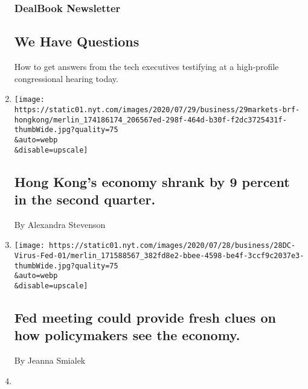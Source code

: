 \begin{enumerate}
  \hypertarget{dealbook-newsletter}{%
  \subsubsection{DealBook Newsletter}\label{dealbook-newsletter}}

  \hypertarget{we-have-questions}{%
  \subsection{We Have Questions}\label{we-have-questions}}

  How to get answers from the tech executives testifying at a
  high-profile congressional hearing today.
\item
  \href{/2020/07/29/business/hong-kongs-economy-shrank-by-9-percent-in-the-second-quarter.html}{}

  \texttt{[image: https://static01.nyt.com/images/2020/07/29/business/29markets-brf-hongkong/merlin\_174186174\_206567ed-298f-464d-b30f-f2dc3725431f-thumbWide.jpg?quality=75\\\&auto=webp\\\&disable=upscale]}

  \hypertarget{hong-kongs-economy-shrank-by-9-percent-in-the-second-quarter}{%
  \subsection{Hong Kong's economy shrank by 9 percent in the second
  quarter.}\label{hong-kongs-economy-shrank-by-9-percent-in-the-second-quarter}}

  By Alexandra Stevenson
\item
  \href{/2020/07/29/business/fed-meeting-could-provide-fresh-clues-on-how-policymakers-see-the-economy.html}{}

  \texttt{[image: https://static01.nyt.com/images/2020/07/28/business/28DC-Virus-Fed-01/merlin\_171588567\_382fd8e2-bbee-4598-be4f-3ccf9c2037e3-thumbWide.jpg?quality=75\\\&auto=webp\\\&disable=upscale]}

  \hypertarget{fed-meeting-could-provide-fresh-clues-on-how-policymakers-see-the-economy}{%
  \subsection{Fed meeting could provide fresh clues on how policymakers
  see the
  economy.}\label{fed-meeting-could-provide-fresh-clues-on-how-policymakers-see-the-economy}}

  By Jeanna Smialek
\item
  \href{/2020/07/29/business/catch-up-universal-amc-deal-l-brands-layoffs-and-more.html}{}


\end{enumerate}
